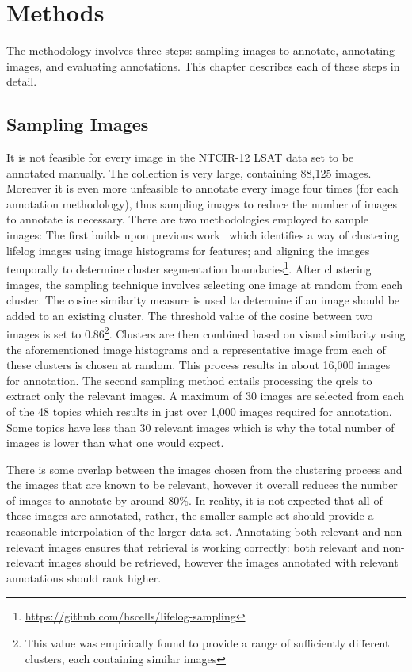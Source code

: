 \chapter{Methods}\label{chapter:methodology}

The methodology involves three steps: sampling images to annotate, annotating images, and evaluating annotations. This chapter describes each of these steps in detail.

\section{Sampling Images}

It is not feasible for every image in the NTCIR-12 LSAT data set to be annotated manually. The collection is very large, containing 88,125 images. Moreover it is even more unfeasible to annotate every image four times (for each annotation methodology), thus sampling images to reduce the number of images to annotate is necessary. There are two methodologies employed to sample images: The first builds upon previous work~\cite{scells2016qut} which identifies a way of clustering lifelog images using image histograms for features; and aligning the images temporally to determine cluster segmentation boundaries\footnote{\url{https://github.com/hscells/lifelog-sampling}}. After clustering images, the sampling technique involves selecting one image at random from each cluster. The cosine similarity measure is used to determine if an image should be added to an existing cluster. The threshold value of the cosine between two images is set to 0.86\footnote{This value was empirically found to provide a range of sufficiently different clusters, each containing similar images}. Clusters are then combined based on visual similarity using the aforementioned image histograms and a representative image from each of these clusters is chosen at random. This process results in about 16,000 images for annotation. The second sampling method entails processing the qrels to extract only the relevant images. A maximum of 30 images are selected from each of the 48 topics which results in just over 1,000 images required for annotation. Some topics have less than 30 relevant images which is why the total number of images is lower than what one would expect.

There is some overlap between the images chosen from the clustering process and the images that are known to be relevant, however it overall reduces the number of images to annotate by around 80\%. In reality, it is not expected that all of these images are annotated, rather, the smaller sample set should provide a reasonable interpolation of the larger data set. Annotating both relevant and non-relevant images ensures that retrieval is working correctly: both relevant and non-relevant images should be retrieved, however the images annotated with relevant annotations should rank higher.

